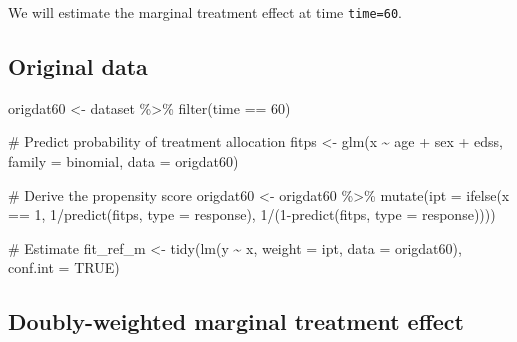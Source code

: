 \documentclass[
  letterpaper,
  DIV=11,
  numbers=noendperiod]{scrreprt}
\newenvironment{Shaded}{\begin{snugshade}}{\end{snugshade}}
\newcommand{\AttributeTok}[1]{\textcolor[rgb]{0.40,0.45,0.13}{#1}}
\newcommand{\CommentTok}[1]{\textcolor[rgb]{0.37,0.37,0.37}{#1}}
\newcommand{\ConstantTok}[1]{\textcolor[rgb]{0.56,0.35,0.01}{#1}}
\newcommand{\DecValTok}[1]{\textcolor[rgb]{0.68,0.00,0.00}{#1}}
\newcommand{\FunctionTok}[1]{\textcolor[rgb]{0.28,0.35,0.67}{#1}}
\newcommand{\NormalTok}[1]{\textcolor[rgb]{0.00,0.23,0.31}{#1}}
\newcommand{\OtherTok}[1]{\textcolor[rgb]{0.00,0.23,0.31}{#1}}
\newcommand{\SpecialCharTok}[1]{\textcolor[rgb]{0.37,0.37,0.37}{#1}}
\newcommand{\StringTok}[1]{\textcolor[rgb]{0.13,0.47,0.30}{#1}}
\begin{document}
We will estimate the marginal treatment effect at time \texttt{time=60}.

\hypertarget{original-data}{%
\subsection{Original data}\label{original-data}}

\begin{Shaded}
\begin{Highlighting}[]
\NormalTok{origdat60 }\OtherTok{\textless{}{-}}\NormalTok{ dataset }\SpecialCharTok{\%\textgreater{}\%} \FunctionTok{filter}\NormalTok{(time }\SpecialCharTok{==} \DecValTok{60}\NormalTok{)}

\CommentTok{\# Predict probability of treatment allocation}
\NormalTok{fitps }\OtherTok{\textless{}{-}} \FunctionTok{glm}\NormalTok{(x }\SpecialCharTok{\textasciitilde{}}\NormalTok{ age }\SpecialCharTok{+}\NormalTok{ sex }\SpecialCharTok{+}\NormalTok{ edss, }\AttributeTok{family =} \StringTok{\textquotesingle{}binomial\textquotesingle{}}\NormalTok{, }
             \AttributeTok{data =}\NormalTok{ origdat60)}

\CommentTok{\# Derive the propensity score}
\NormalTok{origdat60 }\OtherTok{\textless{}{-}}\NormalTok{ origdat60 }\SpecialCharTok{\%\textgreater{}\%} \FunctionTok{mutate}\NormalTok{(}\AttributeTok{ipt =} \FunctionTok{ifelse}\NormalTok{(x }\SpecialCharTok{==} \DecValTok{1}\NormalTok{, }\DecValTok{1}\SpecialCharTok{/}\FunctionTok{predict}\NormalTok{(fitps, }\AttributeTok{type =} \StringTok{\textquotesingle{}response\textquotesingle{}}\NormalTok{),}
                                               \DecValTok{1}\SpecialCharTok{/}\NormalTok{(}\DecValTok{1}\SpecialCharTok{{-}}\FunctionTok{predict}\NormalTok{(fitps, }\AttributeTok{type =} \StringTok{\textquotesingle{}response\textquotesingle{}}\NormalTok{))))}

\CommentTok{\# Estimate }
\NormalTok{fit\_ref\_m }\OtherTok{\textless{}{-}} \FunctionTok{tidy}\NormalTok{(}\FunctionTok{lm}\NormalTok{(y }\SpecialCharTok{\textasciitilde{}}\NormalTok{ x, }\AttributeTok{weight =}\NormalTok{ ipt, }\AttributeTok{data =}\NormalTok{ origdat60), }\AttributeTok{conf.int =} \ConstantTok{TRUE}\NormalTok{) }
\end{Highlighting}
\end{Shaded}

\hypertarget{doubly-weighted-marginal-treatment-effect}{%
\subsection{Doubly-weighted marginal treatment
effect}\label{doubly-weighted-marginal-treatment-effect}}
\end{document}

